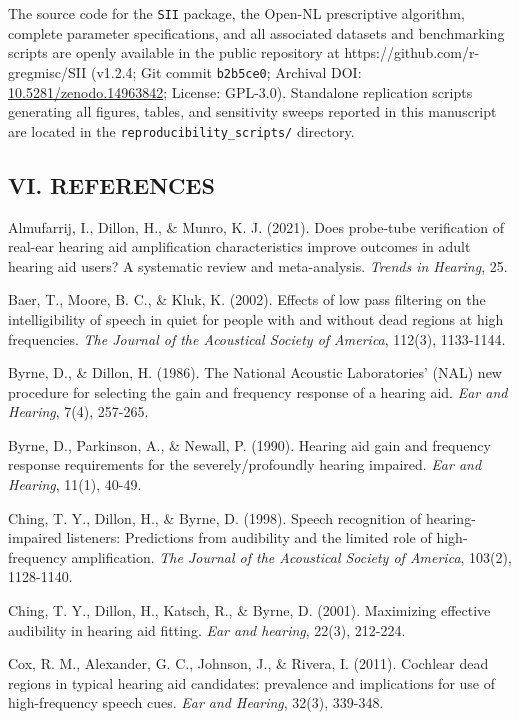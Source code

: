 \documentclass[
  12pt,
]{article}
\begin{document}
The source code for the \texttt{SII} package, the Open-NL prescriptive
algorithm, complete parameter specifications, and all associated
datasets and benchmarking scripts are openly available in the public
repository at https://github.com/r-gregmisc/SII (v1.2.4; Git commit
\texttt{b2b5ce0}; Archival DOI:
\href{https://doi.org/10.5281/zenodo.14963842}{10.5281/zenodo.14963842};
License: GPL-3.0). Standalone replication scripts generating all
figures, tables, and sensitivity sweeps reported in this manuscript are
located in the \texttt{reproducibility\_scripts/} directory.

\subsection{VI. REFERENCES}\label{vi.-references}

Almufarrij, I., Dillon, H., \& Munro, K. J. (2021). Does probe-tube
verification of real-ear hearing aid amplification characteristics
improve outcomes in adult hearing aid users? A systematic review and
meta-analysis. \emph{Trends in Hearing}, 25.

Baer, T., Moore, B. C., \& Kluk, K. (2002). Effects of low pass
filtering on the intelligibility of speech in quiet for people with and
without dead regions at high frequencies. \emph{The Journal of the
Acoustical Society of America}, 112(3), 1133-1144.

Byrne, D., \& Dillon, H. (1986). The National Acoustic Laboratories'
(NAL) new procedure for selecting the gain and frequency response of a
hearing aid. \emph{Ear and Hearing}, 7(4), 257-265.

Byrne, D., Parkinson, A., \& Newall, P. (1990). Hearing aid gain and
frequency response requirements for the severely/profoundly hearing
impaired. \emph{Ear and Hearing}, 11(1), 40-49.

Ching, T. Y., Dillon, H., \& Byrne, D. (1998). Speech recognition of
hearing-impaired listeners: Predictions from audibility and the limited
role of high-frequency amplification. \emph{The Journal of the
Acoustical Society of America}, 103(2), 1128-1140.

Ching, T. Y., Dillon, H., Katsch, R., \& Byrne, D. (2001). Maximizing
effective audibility in hearing aid fitting. \emph{Ear and hearing},
22(3), 212-224.

Cox, R. M., Alexander, G. C., Johnson, J., \& Rivera, I. (2011).
Cochlear dead regions in typical hearing aid candidates: prevalence and
implications for use of high-frequency speech cues. \emph{Ear and
Hearing}, 32(3), 339-348.
\end{document}
